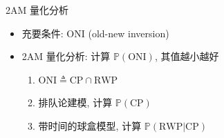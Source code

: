 \begin{frame}{2AM 量化分析}
  \vspace{0.30cm}

  \begin{itemize}
    \setlength{\itemsep}{8pt}
    \item 充要条件: ONI (old-new inversion)
    \item 2AM 量化分析: 计算 $\mathbb{P}(\textrm{ONI})$, 其值越小越好
      \begin{enumerate}
        \setlength{\itemsep}{3pt}
        \item $\textrm{ONI} \triangleq \textrm{CP} \cap \textrm{RWP}$
        \item 排队论建模, 计算 $\mathbb{P}(\textrm{CP})$ \item 带时间的球盒模型, 计算 
          $\mathbb{P}(\textrm{RWP|CP})$
      \end{enumerate}
  \end{itemize}
\end{frame}

